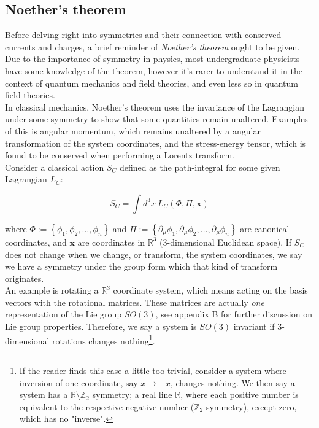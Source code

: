 \documentclass[10pt]{report}
\begin{document}
	\subsection{Noether's theorem}
	Before delving right into symmetries and their connection with conserved currents and charges, a brief reminder of \emph{Noether's theorem} ought to be given. Due to the importance of symmetry in physics, most undergraduate physicists have some knowledge of the theorem, however it's rarer to understand it in the context of quantum mechanics and field theories, and even less so in quantum field theories.\\
	In classical mechanics, Noether's theorem uses the invariance of the Lagrangian under some symmetry to show that some quantities remain unaltered. Examples of this is angular momentum, which remains unaltered by a angular transformation of the system coordinates, and the stress-energy tensor, which is found to be conserved when performing a Lorentz transform.\\
	
	Consider a classical action $S_{C}$ defined as the path-integral for some given Lagrangian $L_{C}$:
	
	\begin{equation}
		S_{C} = \int d^3x \:L_{C}(\Phi,\Pi,\bm{x})
	\end{equation}
	
	where $\Phi := \left\{\phi_1,\phi_2,\ldots,\phi_n\right\}$ and  $\Pi := \left\{\partial_\mu\phi_1,\partial_\mu\phi_2,\ldots,\partial_\mu\phi_n\right\}$ are canonical coordinates, and $\bm{x}$ are coordinates in $\mathbb{R}^3$ (3-dimensional Euclidean space). If $S_C$ does not change when we change, or transform, the system coordinates, we say we have a symmetry under the group form which that kind of transform originates.\\
	An example is  rotating a $\mathbb{R}^3$ coordinate system, which means acting on the basis vectors with the rotational matrices. These matrices are actually \emph{one} representation of the Lie group $SO(3)$, see appendix B for further discussion on Lie group properties. Therefore, we say a system is $SO(3)$ invariant if 3-dimensional rotations changes nothing\footnote{If the reader finds this case a little too trivial, consider a system where inversion of one coordinate, say $x\rightarrow -x$, changes nothing. We then say a system has a $\mathbb{R}\setminus\mathbb{Z}_2$ symmetry; a real line $\mathbb{R}$, where each positive number is equivalent to the respective negative number ($\mathbb{Z}_2$ symmetry), except zero, which has no "inverse".}.\\
	
\end{document}

